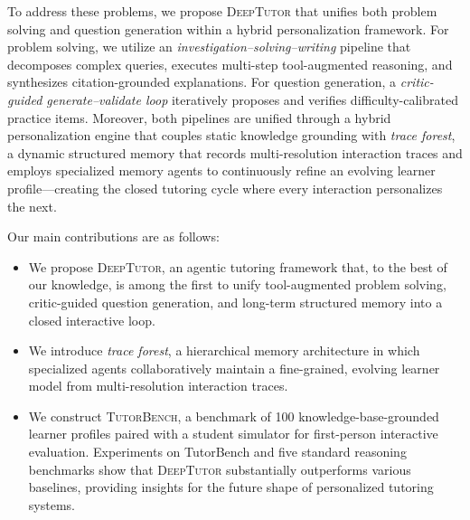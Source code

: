 To address these problems, we propose \textsc{DeepTutor} that unifies both problem solving and question generation within a hybrid personalization framework. 
For problem solving, we utilize an \textit{investigation--solving--writing} pipeline that decomposes complex queries, executes multi-step tool-augmented reasoning, and synthesizes citation-grounded explanations.
For question generation, a \textit{critic-guided generate--validate loop} iteratively proposes and verifies difficulty-calibrated practice items.
Moreover, both pipelines are unified through a hybrid personalization engine that couples static knowledge grounding with \textit{trace forest}, a dynamic structured memory that records multi-resolution interaction traces and employs specialized memory agents to continuously refine an evolving learner profile---creating the closed tutoring cycle where every interaction personalizes the next.

Our main contributions are as follows:
\begin{itemize}[nosep,leftmargin=*]
  \item We propose \textsc{DeepTutor}, an agentic tutoring framework that, to the best of our knowledge, is among the first to unify tool-augmented problem solving, critic-guided question generation, and long-term structured memory into a closed interactive loop.
  \item We introduce \textit{trace forest}, a hierarchical memory architecture in which specialized agents collaboratively maintain a fine-grained, evolving learner model from multi-resolution interaction traces.
  \item We construct \textsc{TutorBench}, a benchmark of 100 knowledge-base-grounded learner profiles paired with a student simulator for first-person interactive evaluation. Experiments on TutorBench and five standard reasoning benchmarks show that \textsc{DeepTutor} substantially outperforms various baselines, providing insights for the future shape of personalized tutoring systems.
\end{itemize}
